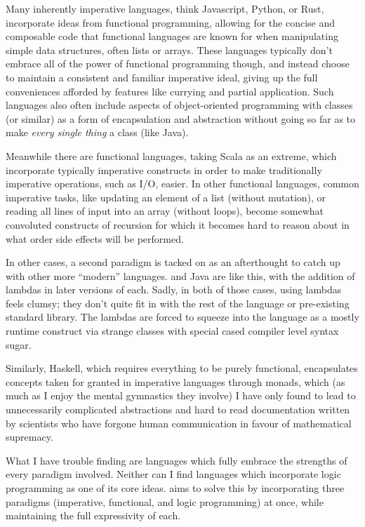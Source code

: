 Many inherently imperative languages, think Javascript, Python, or Rust,
incorporate ideas from functional programming, allowing for the concise and
composable code that functional languages are known for when manipulating simple
data structures, often lists or arrays. These languages typically don't embrace
all of the power of functional programming though, and instead choose to
maintain a consistent and familiar imperative ideal, giving up the full
conveniences afforded by features like currying and partial application.
Such languages also often include aspects of object-oriented programming
with classes (or similar) as a form of encapsulation and abstraction
without going so far as to make \emph{every single thing} a class (like Java).

Meanwhile there are functional languages, taking Scala as an extreme, which
incorporate typically imperative constructs in order to make traditionally
imperative operations, such as I/O, easier. In other functional languages, common
imperative tasks, like updating an element of a list (without mutation), or
reading all lines of input into an array (without loops), become somewhat
convoluted constructs of recursion for which it becomes hard to reason about
in what order side effects will be performed.

In other cases, a second paradigm is tacked on as an afterthought to catch up with
other more ``modern'' languages. \CC{} and Java are like this, with the addition of
lambdas in later versions of each. Sadly, in both of those cases, using lambdas
feels clumsy; they don't quite fit in with the rest of the language or
pre-existing standard library. The lambdas are forced to squeeze into the
language as a mostly runtime construct via strange classes with special cased
compiler level syntax sugar.

Similarly, Haskell, which requires everything to be purely functional, encapsulates
concepts taken for granted in imperative languages through monads, which (as much
as I enjoy the mental gymnastics they involve) I have only found to lead to
unnecessarily complicated abstractions and hard to read documentation written
by scientists who have forgone human communication in favour of mathematical supremacy.

What I have trouble finding are languages which fully embrace the strengths of
every paradigm involved. Neither can I find languages which incorporate logic programming
as one of its core ideas. \Trilogy{} aims to solve this by incorporating
three paradigms (imperative, functional, and logic programming) at once, while
maintaining the full expressivity of each.

